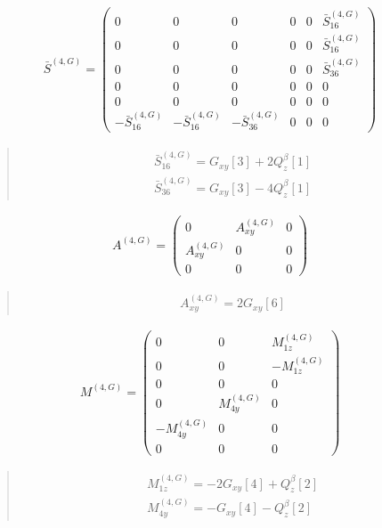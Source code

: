 \documentclass[fleqn,10pt]{jsarticle}
\begin{document}
\begin{align*}
\bar{S}^{(4,G)} = \begin{pmatrix} 0 & 0 & 0 & 0 & 0 & \bar{S}^{(4,G)}_{16} \\ 0 & 0 & 0 & 0 & 0 & \bar{S}^{(4,G)}_{16} \\ 0 & 0 & 0 & 0 & 0 & \bar{S}^{(4,G)}_{36} \\ 0 & 0 & 0 & 0 & 0 & 0 \\ 0 & 0 & 0 & 0 & 0 & 0 \\ - \bar{S}^{(4,G)}_{16} & - \bar{S}^{(4,G)}_{16} & - \bar{S}^{(4,G)}_{36} & 0 & 0 & 0 \end{pmatrix}
\end{align*}
\begin{quote}
\begin{align*}
& \bar{S}^{(4,G)}_{16} = G_{xy}[3] + 2 Q_{z}^{\beta}[1] \\
& \bar{S}^{(4,G)}_{36} = G_{xy}[3] - 4 Q_{z}^{\beta}[1]
\end{align*}
\end{quote}
\begin{align*}
A^{(4,G)} = \begin{pmatrix} 0 & A^{(4,G)}_{xy} & 0 \\ A^{(4,G)}_{xy} & 0 & 0 \\ 0 & 0 & 0 \end{pmatrix}
\end{align*}
\begin{quote}
\begin{align*}
& A^{(4,G)}_{xy} = 2 G_{xy}[6]
\end{align*}
\end{quote}
\begin{align*}
M^{(4,G)} = \begin{pmatrix} 0 & 0 & M^{(4,G)}_{1z} \\ 0 & 0 & - M^{(4,G)}_{1z} \\ 0 & 0 & 0 \\ 0 & M^{(4,G)}_{4y} & 0 \\ - M^{(4,G)}_{4y} & 0 & 0 \\ 0 & 0 & 0 \end{pmatrix}
\end{align*}
\begin{quote}
\begin{align*}
& M^{(4,G)}_{1z} = - 2 G_{xy}[4] + Q_{z}^{\beta}[2] \\
& M^{(4,G)}_{4y} = - G_{xy}[4] - Q_{z}^{\beta}[2]
\end{align*}
\end{quote}
\end{document}
